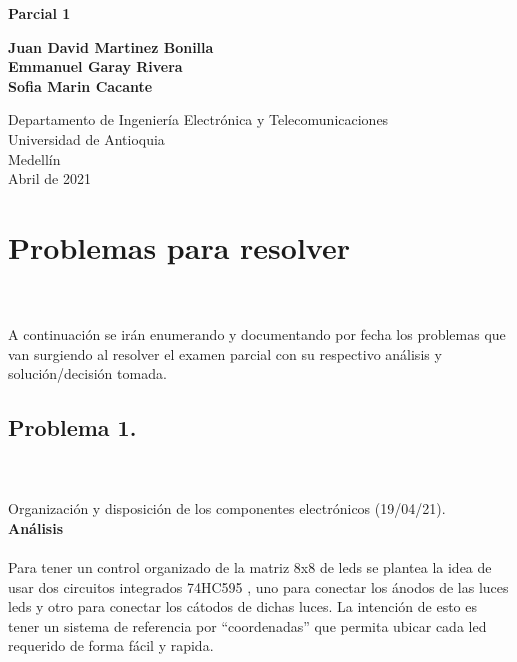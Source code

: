 \documentclass{article}
\begin{document}
\begin{titlepage}
    \begin{center}
        \vspace*{1cm}
            
        \Huge
        \textbf{Parcial 1}
            
        \vspace{0.5cm}
        \LARGE
            
        \vspace{5cm}
            
        \textbf{Juan David Martinez Bonilla}\\
        \textbf{Emmanuel Garay Rivera}\\
        \textbf{Sofia Marin Cacante}
            
        \vfill
            
        \vspace{0.8cm}
            
        \Large
        Departamento de Ingeniería Electrónica y Telecomunicaciones\\
        Universidad de Antioquia\\
        Medellín\\
        Abril de 2021
            
    \end{center}
\end{titlepage}

\tableofcontents

\newpage
\section{\large Problemas para resolver }\\\\
A continuación se irán enumerando y documentando por fecha los problemas que van surgiendo al resolver el examen parcial con su respectivo análisis y solución/decisión tomada.\\

\subsection{\large Problema 1.}\\\\	Organización y disposición de los componentes electrónicos (19/04/21).\\

\textbf{\large Análisis}\\\\
Para tener un control organizado de la matriz 8x8 de leds se plantea la idea de usar dos circuitos integrados 74HC595 \cite{johann}, uno para conectar los ánodos de las luces leds y otro para conectar los cátodos de dichas luces.
La intención de esto es tener un sistema de referencia por “coordenadas” que permita ubicar cada led requerido de forma fácil y rapida.\\
\end{document}
